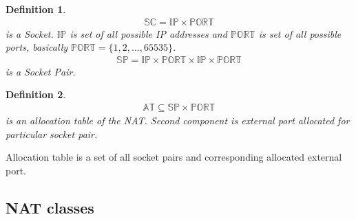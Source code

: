 \documentclass[twoside]{article}
\newtheorem{mydef}{Definition}
\begin{document}
\begin{multicols}{2}
\begin{mydef}
\begin{align*}
\mathbb{SC} = \mathbb{IP} \times \mathbb{PORT}
\end{align*} is a Socket. $\mathbb{IP}$ is set of all possible IP addresses and $\mathbb{PORT}$ 
is set of all possible ports, basically $\mathbb{PORT} = \{1,2,\dots,65535\}$.
\begin{align*}
\mathbb{SP} = \mathbb{IP} \times \mathbb{PORT} \times \mathbb{IP} \times \mathbb{PORT}
\end{align*} is a Socket Pair.
\end{mydef}

\begin{mydef}
\begin{align*}
\mathbb{AT} \subseteq \mathbb{SP} \times \mathbb{PORT}
\end{align*} is an allocation table of the NAT. Second component is external port allocated for particular socket pair.
\end{mydef}
Allocation table is a set of all socket pairs and corresponding allocated external port.

% 
% 

\subsection{NAT classes}


\end{multicols}
\end{document}
